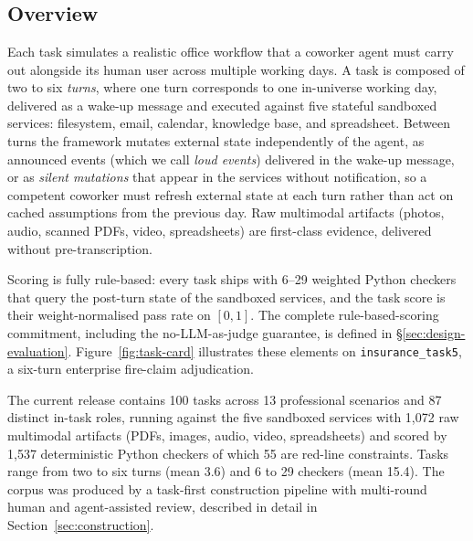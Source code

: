 
\section{\bench}
\label{sec:design}

\subsection{Overview}
\label{sec:design-overview}

Each \bench{} task simulates a realistic office workflow that a coworker agent must carry out alongside its human user across multiple working days. A task is composed of two to six \emph{turns}, where one turn corresponds to one in-universe working day, delivered as a wake-up message and executed against five stateful sandboxed services: filesystem, email, calendar, knowledge base, and spreadsheet. Between turns the framework mutates external state independently of the agent, as announced events (which we call \emph{loud events}) delivered in the wake-up message, or as \emph{silent mutations} that appear in the services without notification, so a competent coworker must refresh external state at each turn rather than act on cached assumptions from the previous day. Raw multimodal artifacts (photos, audio, scanned PDFs, video, spreadsheets) are first-class evidence, delivered without pre-transcription.

Scoring is fully rule-based: every task ships with 6--29 weighted Python checkers that query the post-turn state of the sandboxed services, and the task score is their weight-normalised pass rate on $[0, 1]$. The complete rule-based-scoring commitment, including the no-LLM-as-judge guarantee, is defined in \S\ref{sec:design-evaluation}. Figure~\ref{fig:task-card} illustrates these elements on \texttt{insurance\_task5}, a six-turn enterprise fire-claim adjudication.



The current release contains 100 tasks across 13 professional scenarios and 87 distinct in-task roles, running against the five sandboxed services with 1{,}072 raw multimodal artifacts (PDFs, images, audio, video, spreadsheets) and scored by 1{,}537 deterministic Python checkers of which 55 are red-line constraints. Tasks range from two to six turns (mean 3.6) and 6 to 29 checkers (mean 15.4). The corpus was produced by a task-first construction pipeline with multi-round human and agent-assisted review, described in detail in Section~\ref{sec:construction}.


